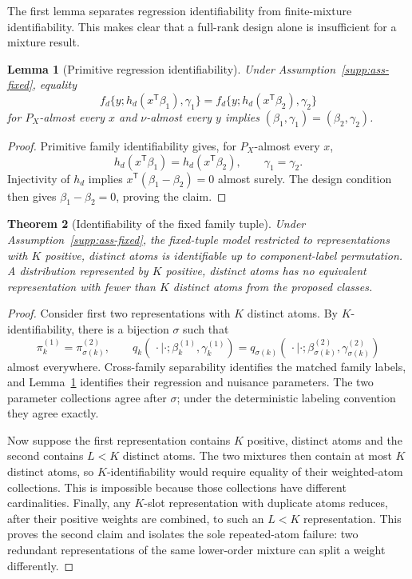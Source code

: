 \documentclass[a4paper,fleqn]{cas-sc}
\newtheorem{theorem}{Theorem}[section]
\newtheorem{lemma}[theorem]{Lemma}
\newcommand{\T}{\mathsf T}
\numberwithin{equation}{section}
\begin{document}
The first lemma separates regression identifiability from finite-mixture identifiability. This makes clear that a full-rank design alone is insufficient for a mixture result.

\begin{lemma}[Primitive regression identifiability]
\label{supp:lem-component}
Under Assumption~\ref{supp:ass-fixed}, equality
\[
 f_d\{y;h_d(x^\T\beta_1),\gamma_1\}
 =f_d\{y;h_d(x^\T\beta_2),\gamma_2\}
\]
for $P_X$-almost every $x$ and $\nu$-almost every $y$ implies
$(\beta_1,\gamma_1)=(\beta_2,\gamma_2)$.
\end{lemma}

\begin{proof}
Primitive family identifiability gives, for $P_X$-almost every $x$,
\[
 h_d(x^\T\beta_1)=h_d(x^\T\beta_2),\qquad \gamma_1=\gamma_2.
\]
Injectivity of $h_d$ implies $x^\T(\beta_1-\beta_2)=0$ almost surely. The design condition then gives $\beta_1-\beta_2=0$, proving the claim.
\end{proof}

\begin{theorem}[Identifiability of the fixed family tuple]
\label{supp:thm-ident}
Under Assumption~\ref{supp:ass-fixed}, the fixed-tuple model restricted to representations with $K$ positive, distinct atoms is identifiable up to component-label permutation. A distribution represented by $K$ positive, distinct atoms has no equivalent representation with fewer than $K$ distinct atoms from the proposed classes.
\end{theorem}

\begin{proof}
Consider first two representations with $K$ distinct atoms. By $K$-identifiability, there is a bijection $\sigma$ such that
\[
 \pi_k^{(1)}=\pi_{\sigma(k)}^{(2)},\qquad
 q_k(\,\cdot\mid\cdot;\beta_k^{(1)},\gamma_k^{(1)})
 =q_{\sigma(k)}(\,\cdot\mid\cdot;
 \beta_{\sigma(k)}^{(2)},\gamma_{\sigma(k)}^{(2)})
\]
almost everywhere. Cross-family separability identifies the matched family labels, and Lemma~\ref{supp:lem-component} identifies their regression and nuisance parameters. The two parameter collections agree after $\sigma$; under the deterministic labeling convention they agree exactly.

Now suppose the first representation contains $K$ positive, distinct atoms and the second contains $L<K$ distinct atoms. The two mixtures then contain at most $K$ distinct atoms, so $K$-identifiability would require equality of their weighted-atom collections. This is impossible because those collections have different cardinalities. Finally, any $K$-slot representation with duplicate atoms reduces, after their positive weights are combined, to such an $L<K$ representation. This proves the second claim and isolates the sole repeated-atom failure: two redundant representations of the same lower-order mixture can split a weight differently.
\end{proof}
\end{document}

